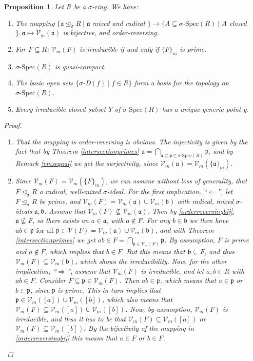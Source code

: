 \documentclass{article}
\def\Vm{\mathcal{V}_m}
\def\V{\mathcal{V}}
\def\a{\mathfrak{a}}
\def\b{\mathfrak{b}}
\def\p{\mathfrak{p}}
\def\s{\sigma}
\def\si{\unlhd_{\sigma}}
\def\sSpec{\sigma\text{-Spec}}
\def\fa{\text{ for all }}
\newenvironment{bew}{\begin{proof}[Proof]}{\end{proof}}
\theoremstyle{plain}
\newtheorem{prop}[Satz]{Proposition}
\theoremstyle{definition}
\begin{document}
\begin{prop}
Let $R$ be a $\s$-ring. We have:
\begin{enumerate}
\item \label{vmbijection} The mapping $\{ \a \si R \mid \a$ mixed and radical $\} \rightarrow \{ A \subseteq \sSpec(R) \mid A $ closed $\}, \a \mapsto \Vm(\a)$ is bijective, and order-reversing.
\item \label{irred=prime} For $F \subseteq R$:  $\Vm(F)$ is irreducible if and only if $\{F\}_m$ is prime.
\item $\sSpec(R)$ is quasi-compact.
\item The basic open sets $\{ \s$-D$(f) \mid f \in R \}$ form a basis for the topology on $\sSpec(R)$.
\item Every irreducible closed subset $Y$ of $\sSpec(R)$ has a unique generic point $y$.
\end{enumerate}
\begin{bew}
\begin{enumerate}
\item \label{orderreversingbij} That the mapping is order-reversing is obvious. The injectivity is given by the fact that by Theorem \ref{intersectionprimes} $\a = \bigcap_{\a \subseteq \p \in \sSpec(R)} \p$, and by Remark \ref{vmsequal} we get the surjectivity,
 since $\Vm(\a) = \Vm(\{\a\}_m)$.
\item Since $\Vm(F) = \Vm(\{F\}_m)$, we can assume without loss of generality, that $F \si R$ a radical, well-mixed $\s$-ideal.
For the first implication, ``$\Leftarrow$'', let $F \si R$ be prime, and $\Vm(F) = \Vm(\a) \cup \Vm(\b)$ with radical, mixed $\s$-ideals $\a, \b$. Assume that $\Vm(F) \not\subseteq \Vm(\a)$. Then by \ref{orderreversingbij}, $\a \not \subseteq F$, so there exists an $a \in \a$, with $a \notin F$.
For any $b \in \b$ we then have $ab \in \p \fa \p \in \V(F) = \Vm(\a) \cup \Vm(\b)$, and with Theorem \ref{intersectionprimes} we get $ab \in F = \bigcap_{\p \in \Vm(F)}\p$. By assumption, $F$ is prime and $a \notin F$, which implies
 that  $b \in F$. But this means that $\b \subseteq F$, and thus $\Vm(F) \subseteq \Vm(\b)$, which shows the irreducibility. 
Now, for the other implication, ``$\Rightarrow$'', assume that $\Vm(F)$ is irreducible, and let $a,b \in R$ with $ab \in F$. Consider $F \subseteq \p \in \Vm(F)$. Then $ab \in \p$, 
which means that $a \in \p$ or $b \in \p$, since $\p$ is prime. This in turn implies that $\p \in \Vm([a]) \cup \Vm([b])$, which also means that $\Vm(F) \subseteq \Vm([a]) \cup \Vm([b])$.
Now, by assumption, $\Vm(F)$ is irreducible, and thus it has to be that $\Vm(F) \subseteq \Vm([a])$ or $\Vm(F) \subseteq \Vm([b])$. By the bijectivity of the mapping in \ref{orderreversingbij} this means that $a \in F$ or $b \in F$.

\end{enumerate}
\end{bew}
\end{prop}
\end{document}

